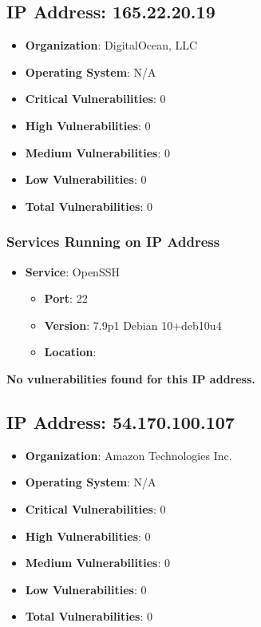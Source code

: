 \documentclass{article}
\begin{document}
\clearpage



\subsection*{IP Address: 165.22.20.19}

\begin{itemize}
    \item \textbf{Organization}: DigitalOcean, LLC
    \item \textbf{Operating System}:  N/A 
    \item \textbf{Critical Vulnerabilities}: 0
    \item \textbf{High Vulnerabilities}: 0
    \item \textbf{Medium Vulnerabilities}: 0
    \item \textbf{Low Vulnerabilities}: 0
    \item \textbf{Total Vulnerabilities}: 0
\end{itemize}

\subsubsection*{Services Running on IP Address}

\begin{itemize}
    
        \item \textbf{Service}: OpenSSH
        \begin{itemize}
            \item \textbf{Port}: 22
            \item \textbf{Version}:  7.9p1 Debian 10+deb10u4 
            \item \textbf{Location}: \href{  }{  }
        \end{itemize}
    
\end{itemize}


\textbf{No vulnerabilities found for this IP address.}




\clearpage



\subsection*{IP Address: 54.170.100.107}

\begin{itemize}
    \item \textbf{Organization}: Amazon Technologies Inc.
    \item \textbf{Operating System}:  N/A 
    \item \textbf{Critical Vulnerabilities}: 0
    \item \textbf{High Vulnerabilities}: 0
    \item \textbf{Medium Vulnerabilities}: 0
    \item \textbf{Low Vulnerabilities}: 0
    \item \textbf{Total Vulnerabilities}: 0
\end{itemize}
\end{document}

